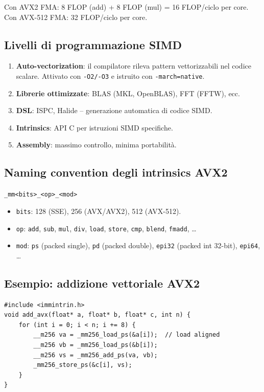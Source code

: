 \documentclass[11pt,a4paper]{article}
\theoremstyle{remark}
\begin{document}
Con AVX2 FMA: 8 FLOP (add) + 8 FLOP (mul) = 16 FLOP/ciclo per core.
Con AVX-512 FMA: 32 FLOP/ciclo per core.

\subsection{Livelli di programmazione SIMD}

\begin{enumerate}
  \item \textbf{Auto-vectorization}: il compilatore rileva pattern vettorizzabili nel codice scalare. Attivato con \texttt{-O2/-O3} e istruito con \texttt{-march=native}.
  \item \textbf{Librerie ottimizzate}: BLAS (MKL, OpenBLAS), FFT (FFTW), ecc.
  \item \textbf{DSL}: ISPC, Halide -- generazione automatica di codice SIMD.
  \item \textbf{Intrinsics}: API C per istruzioni SIMD specifiche.
  \item \textbf{Assembly}: massimo controllo, minima portabilità.
\end{enumerate}

\subsection{Naming convention degli intrinsics AVX2}

\texttt{\_mm<bits>\_<op>\_<mod>}
\begin{itemize}
  \item \texttt{bits}: 128 (SSE), 256 (AVX/AVX2), 512 (AVX-512).
  \item \texttt{op}: \texttt{add}, \texttt{sub}, \texttt{mul}, \texttt{div}, \texttt{load}, \texttt{store}, \texttt{cmp}, \texttt{blend}, \texttt{fmadd}, \dots
  \item \texttt{mod}: \texttt{ps} (packed single), \texttt{pd} (packed double), \texttt{epi32} (packed int 32-bit), \texttt{epi64}, \dots
\end{itemize}

\subsection{Esempio: addizione vettoriale AVX2}

\begin{lstlisting}
#include <immintrin.h>
void add_avx(float* a, float* b, float* c, int n) {
    for (int i = 0; i < n; i += 8) {
        __m256 va = _mm256_load_ps(&a[i]);  // load aligned
        __m256 vb = _mm256_load_ps(&b[i]);
        __m256 vs = _mm256_add_ps(va, vb);
        _mm256_store_ps(&c[i], vs);
    }
}
\end{lstlisting}
\end{document}
